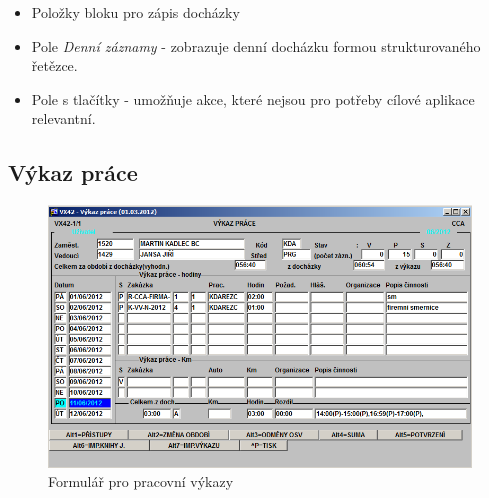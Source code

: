 \documentclass{diplomka}
\begin{document}
\begin{itemize}[noitemsep,nolistsep]
\item Položky bloku pro zápis docházky
\item Pole \emph{Denní záznamy} - zobrazuje denní docházku formou strukturovaného řetězce.
\item Pole s tlačítky - umožňuje akce, které nejsou pro potřeby cílové aplikace relevantní.
\end{itemize}

\newpage
\subsection{Výkaz práce}
\begin{figure}[H]
  \centering
  \includegraphics[scale=0.7]{obr/VX42.png}
\caption{Formulář pro pracovní výkazy}
\label{fig:rep}
\end{figure}
\end{document}
